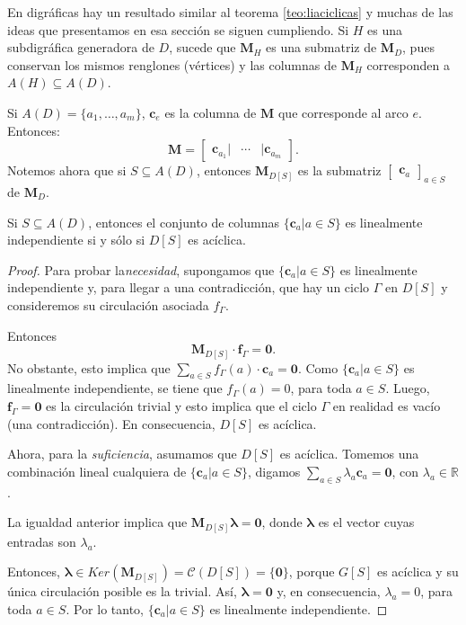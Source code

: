 En digráficas hay un resultado similar al teorema \ref{teo:liaciclicas} y muchas de las ideas que presentamos en esa sección se siguen cumpliendo. Si $H$ es una subdigráfica generadora de $D$,  sucede que $\mathbf{M}_{H}$ es una submatriz de $\mathbf{M}_{D}$, pues conservan los mismos renglones (vértices) y las columnas de $\mathbf{M}_{H}$ corresponden a $A(H)\subseteq A(D)$.

Si $A(D)=\{a_{1}, \ldots, a_{m}\}$, $\mathbf{c}_{e}$ es la columna de $\mathbf{M}$ que corresponde al arco $e$. Entonces:
$$
\mathbf{M}=\begin{bmatrix}
\mathbf{c}_{a_{1}} |& \cdots & |\mathbf{c}_{a_{m}} 
\end{bmatrix}.
$$
Notemos ahora que si $S \subseteq A(D)$, entonces $\mathbf{M}_{D[S]}$ es la submatriz $\begin{bmatrix}
\mathbf{c}_{a}  
\end{bmatrix}_{a \in S}$ de $\mathbf{M}_{D}$.

\begin{teo}\label{teo:liaciclicas2} Si $S \subseteq A(D)$, entonces
el conjunto de columnas $\{\mathbf{c}_{a} | a \in S\}$ es linealmente independiente si y sólo si $D[S]$ es acíclica.
\end{teo}

\begin{proof}
Para probar la\textit{necesidad}, supongamos que $\{\mathbf{c}_{a} | a \in S\}$ es linealmente independiente y, para llegar a una contradicción, que hay un ciclo $\Gamma$ en $D[S]$ y consideremos su circulación asociada $f_{\Gamma}$. 

Entonces $$\mathbf{M}_{D[S]}\cdot\mathbf{f}_{\Gamma}= \mathbf{0}.$$ No obstante, esto implica que $\sum_{a \in S} f_{\Gamma}(a)\cdot\mathbf{c}_{a} = \mathbf{0}$. Como $\{\mathbf{c}_{a} | a \in S\}$ es linealmente independiente, se tiene que $f_{\Gamma}(a) = 0$, para toda $a \in S$. Luego, $\mathbf{f}_{\Gamma} = \mathbf{0}$ es la circulación trivial y esto implica que el ciclo $\Gamma$ en realidad es vacío (una contradicción). En consecuencia, $D[S]$ es acíclica.

Ahora, para la \textit{suficiencia}, asumamos que $D[S]$ es acíclica. Tomemos una combinación lineal cualquiera de $\{\mathbf{c}_{a} | a \in S\}$, digamos $\sum_{a \in S} \lambda_{a} \mathbf{c}_{a} = \mathbf{0}$, con $\lambda_{a} \in \mathbb{R}$.

La igualdad anterior implica que $\mathbf{M}_{D[S]}\boldsymbol{\lambda} = \mathbf{0}$, donde $\boldsymbol{\lambda}$ es el vector cuyas entradas son $\lambda_{a}$.

Entonces, $\boldsymbol{\lambda} \in Ker(\mathbf{M}_{D[S]}) = \mathcal{C}(D[S]) = \{\mathbf{0}\}$, porque $G[S]$ es acíclica y su única circulación posible es la trivial. Así, $\boldsymbol{\lambda} = \mathbf{0}$ y, en consecuencia, $\lambda_{a} = 0$, para toda $a \in S$. Por lo tanto, $\{\mathbf{c}_{a} | a \in S\}$ es linealmente independiente.

\end{proof}
 
